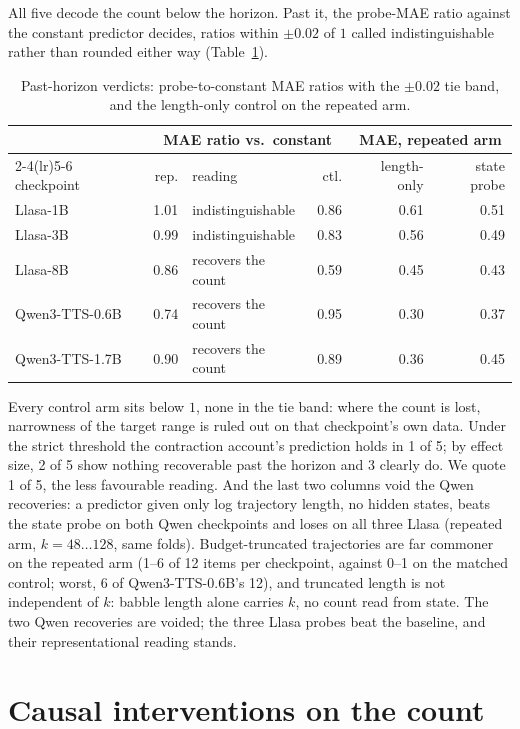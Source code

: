 All five decode the count below the horizon. Past it, the probe-MAE
ratio against the constant predictor decides, ratios within $\pm0.02$
of $1$ called indistinguishable rather than rounded either way
(Table~\ref{tab:probeverdicts}).
\begin{table}[tp]\centering
\caption{Past-horizon verdicts: probe-to-constant MAE ratios with the $\pm0.02$ tie band, and the length-only control on the repeated arm.}
\label{tab:probeverdicts}
\begin{tabular}{lrlrrr}
\toprule
 & \multicolumn{3}{c}{MAE ratio vs.\ constant} & \multicolumn{2}{c}{MAE, repeated arm} \\
\cmidrule(lr){2-4}\cmidrule(lr){5-6}
checkpoint & rep. & reading & ctl. & length-only & state probe \\
\midrule
Llasa-1B       & 1.01 & indistinguishable & 0.86 & 0.61 & 0.51 \\
Llasa-3B       & 0.99 & indistinguishable & 0.83 & 0.56 & 0.49 \\
Llasa-8B       & 0.86 & recovers the count & 0.59 & 0.45 & 0.43 \\
Qwen3-TTS-0.6B & 0.74 & recovers the count & 0.95 & 0.30 & 0.37 \\
Qwen3-TTS-1.7B & 0.90 & recovers the count & 0.89 & 0.36 & 0.45 \\
\bottomrule
\end{tabular}
\end{table}
Every control arm sits below $1$, none in the tie band: where the count
is lost, narrowness of the target range is ruled out on that
checkpoint's own data. Under the strict threshold the contraction
account's prediction holds in 1 of 5; by effect size, 2 of 5 show
nothing recoverable past the horizon and 3 clearly do. We quote 1 of 5,
the less favourable reading. And the last two columns void the Qwen
recoveries: a predictor given only log trajectory length, no hidden
states, beats the state probe on both Qwen checkpoints and loses on all
three Llasa (repeated arm, $k=48\ldots128$, same folds).
Budget-truncated trajectories are far commoner on the repeated arm
(1--6 of 12 items per checkpoint, against 0--1 on the matched control;
worst, 6 of Qwen3-TTS-0.6B's 12), and truncated length is not
independent of $k$: babble length alone carries $k$, no count read from
state. The two Qwen recoveries are voided; the three Llasa probes beat
the baseline, and their representational reading stands.

\section{Causal interventions on the count}
\label{sec:causal}

